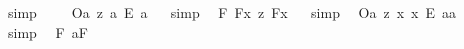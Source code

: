 \begin{isabellebody}
\ {\isacharparenleft}simp{\isacharparenright}%
\endisatagproof
{\isafoldproof}%
%
\isadelimproof
%
\endisadelimproof
\ \isamarkupfalse%
%
\isadelimproof
\ %
\endisadelimproof
%
\isatagproof
{}\isamarkupfalse%
%
\endisatagproof
{\isafoldproof}%
%
\isadelimproof
%
\endisadelimproof
\isanewline
\isanewline
{}\isamarkupfalse%
\ {\isachardoublequoteopen}{\isacharbrackleft}{\isacharless}O\isactrlsup {\isacharbang}{\isasymbullet}a{\isachargreater}\ {\isasymrightarrow}\isactrlsup z\ a\ {\isacharequal}\isactrlsub E\ a{\isacharbrackright}{\isachardoublequoteclose}%
\isadelimproof
\ %
\endisadelimproof
%
\isatagproof
{}\isamarkupfalse%
\ {\isacharparenleft}simp{\isacharparenright}\ \isamarkupfalse%
%
\endisatagproof
{\isafoldproof}%
%
\isadelimproof
%
\endisadelimproof
\isanewline
\isanewline
{}\isamarkupfalse%
\ {\isachardoublequoteopen}{\isacharbrackleft}{\isacharparenleft}{\isasymforall}{\isacharparenleft}{\isasymlambda}F{\isachardot}\ {\isacharless}{\isachardot}F{\isachardot}{\isasymbullet}{\isachardot}x{\isachardot}{\isachargreater}\ {\isasymequiv}\isactrlsup z\ {\isacharless}{\isachardot}F{\isachardot}{\isasymbullet}{\isachardot}x{\isachardot}{\isachargreater}{\isacharparenright}{\isacharparenright}{\isacharbrackright}{\isachardoublequoteclose}%
\isadelimproof
\ %
\endisadelimproof
%
\isatagproof
{}\isamarkupfalse%
\ {\isacharparenleft}simp{\isacharparenright}\ \isamarkupfalse%
%
\endisatagproof
{\isafoldproof}%
%
\isadelimproof
%
\endisadelimproof
\isanewline
{}\isamarkupfalse%
\ {\isachardoublequoteopen}{\isacharbrackleft}{\isacharless}O\isactrlsup {\isacharbang}{\isasymbullet}a{\isachargreater}\ {\isasymrightarrow}\isactrlsup z\ {\isacharless}{\isasymlambda}x{\isachardot}\ {\isachardot}x{\isachardot}\ {\isacharequal}\isactrlsub E\ a{\isacharparenright}{\isasymbullet}a{\isachargreater}{\isacharbrackright}{\isachardoublequoteclose}%
\isadelimproof
\ %
\endisadelimproof
%
\isatagproof
{}\isamarkupfalse%
\ {\isacharparenleft}simp{\isacharparenright}\ \isamarkupfalse%
%
\endisatagproof
{\isafoldproof}%
%
\isadelimproof
%
\endisadelimproof
\isanewline
\isanewline
{}\isamarkupfalse%
\ {\isachardoublequoteopen}{\isacharbrackleft}{\isacharparenleft}{\isasymexists}{\isacharparenleft}{\isasymlambda}F{\isachardot}\ {\isacharless}a{\isasymcirc}{\isachardot}F{\isachardot}{\isachargreater}{\isacharparenright}{\isacharparenright}{\isacharbrackright}{\isachardoublequoteclose}%

\end{isabellebody}
